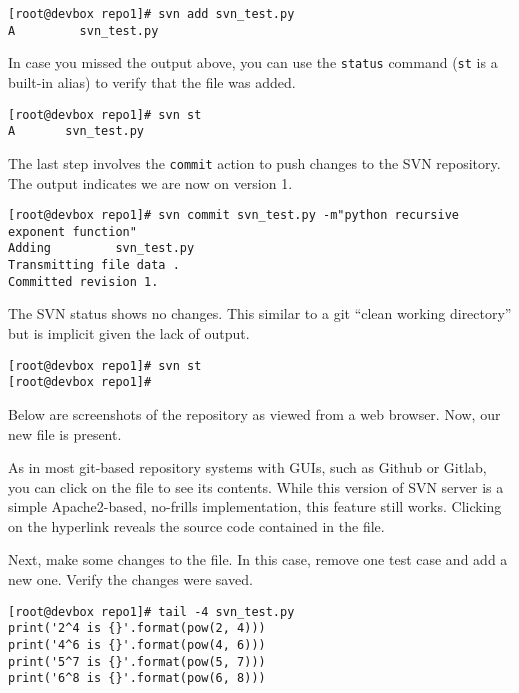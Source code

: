 \begin{verbatim}
[root@devbox repo1]# svn add svn_test.py 
A         svn_test.py
\end{verbatim}

In case you missed the output above, you can use the \verb|status| command
(\verb|st| is a built-in alias) to verify that the file was added.

\begin{verbatim}
[root@devbox repo1]# svn st
A       svn_test.py
\end{verbatim}

The last step involves the \verb|commit| action to push changes to the SVN
repository. The output indicates we are now on version 1.

\begin{verbatim}
[root@devbox repo1]# svn commit svn_test.py -m"python recursive exponent function"
Adding         svn_test.py
Transmitting file data .
Committed revision 1.
\end{verbatim}

The SVN status shows no changes. This similar to a git ``clean working
directory'' but is implicit given the lack of output.

\begin{verbatim}
[root@devbox repo1]# svn st
[root@devbox repo1]#
\end{verbatim}

Below are screenshots of the repository as viewed from a web browser. Now, our
new file is present.


As in most git-based repository systems with GUIs, such as Github or Gitlab,
you can click on the file to see its contents. While this version of SVN
server is a simple Apache2-based, no-frills implementation, this feature still
works. Clicking on the hyperlink reveals the source code contained in the file.


Next, make some changes to the file. In this case, remove one test case and
add a new one. Verify the changes were saved.

\begin{verbatim}
[root@devbox repo1]# tail -4 svn_test.py
print('2^4 is {}'.format(pow(2, 4)))
print('4^6 is {}'.format(pow(4, 6)))
print('5^7 is {}'.format(pow(5, 7)))
print('6^8 is {}'.format(pow(6, 8)))
\end{verbatim}

